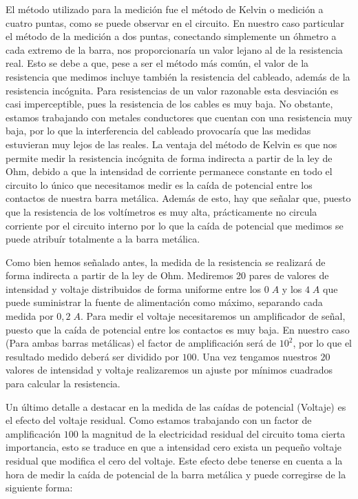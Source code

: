 \documentclass[a4paper,12pt,titlepage]{report}
\begin{document}
El método utilizado para la medición fue el método de Kelvin o medición a cuatro puntas, como se puede observar en el circuito. En nuestro caso particular el método de la medición a dos puntas, conectando simplemente un óhmetro a cada extremo de la barra, nos proporcionaría un valor lejano al de la resistencia real. Esto se debe a que, pese a ser el método más común, el valor de la resistencia que medimos incluye también la resistencia del cableado, además de la resistencia incógnita. Para resistencias de un valor razonable esta desviación es casi imperceptible, pues la resistencia de los cables es muy baja. No obstante, estamos trabajando con metales conductores que cuentan con una resistencia muy baja, por lo que la interferencia del cableado provocaría que las medidas estuvieran muy lejos de las reales. La ventaja del método de Kelvin es que nos permite medir la resistencia incógnita de forma indirecta a partir de la ley de Ohm, debido a que la intensidad de corriente permanece constante en todo el circuito lo único que necesitamos medir es la caída de potencial entre los contactos de nuestra barra metálica. Además de esto, hay que señalar que, puesto que la resistencia de los voltímetros es muy alta, prácticamente no circula corriente por el circuito interno por lo que la caída de potencial que medimos se puede atribuír totalmente a la barra metálica.

\par Como bien hemos señalado antes, la medida de la resistencia se realizará de forma indirecta a partir de la ley de Ohm. Mediremos 20 pares de valores de intensidad y voltaje distribuidos de forma uniforme entre los $0 \; A$ y los $4 \; A$ que puede suministrar la fuente de alimentación como máximo, separando cada medida por $0,2 \; A$. Para medir el voltaje necesitaremos un amplificador de señal, puesto que la caída de potencial entre los contactos es muy baja. En nuestro caso (Para ambas barras metálicas) el factor de amplificación será de $10^2$, por lo que el resultado medido deberá ser dividido por $100$. Una vez tengamos nuestros $20$ valores de intensidad y voltaje realizaremos un ajuste por mínimos cuadrados para calcular la resistencia.

\par Un último detalle a destacar en la medida de las caídas de potencial (Voltaje) es el efecto del voltaje residual. Como estamos trabajando con un factor de amplificación $100$ la magnitud de la electricidad residual del circuito toma cierta importancia, esto se traduce en que a intensidad cero exista un pequeño voltaje residual que modifica el cero del voltaje. Este efecto debe tenerse en cuenta a la hora de medir la caída de potencial de la barra metálica y puede corregirse de la siguiente forma:
\end{document}
